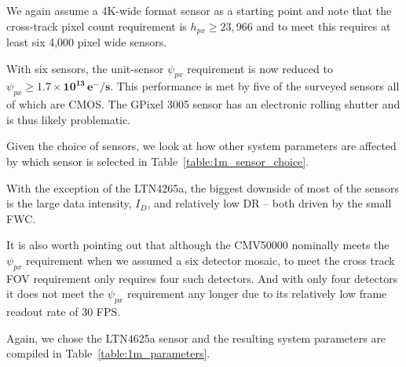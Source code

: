 \documentclass[10pt,journal]{IEEEtran}  %
\begin{document}
We again assume a 4K-wide format sensor as a starting point and note that the cross-track pixel count requirement is $h_{px} \geq 23,966$ and to meet this requires at least six 4,000 pixel wide sensors.

With six sensors, the unit-sensor $\psi_{px}$ requirement is now reduced to $\psi_{px} \geq \mathbf{1.7 \times 10^{13} \, e^-/s}$. This performance is met by five of the surveyed sensors all of which are CMOS.  The GPixel 3005 sensor has an electronic rolling shutter and is thus likely problematic.

Given the choice of sensors, we look at how other system parameters are affected by which sensor is selected in Table~\ref{table:1m_sensor_choice}.

\begin{table}[h!]
\centering
{}
\caption{Impact of sensor choice on other system parameters}
\label{table:1m_sensor_choice}
\end{table}

With the exception of the LTN4265a, the biggest downside of most of the sensors is the large data intensity, $I_D$, and relatively low DR -- both driven by the small FWC.

It is also worth pointing out that although the CMV50000 nominally meets the $\psi_{px}$ requirement when we assumed a six detector mosaic, to meet the cross track FOV requirement only requires four such detectors.  And with only four detectors it does not meet the $\psi_{px}$ requirement any longer due to its relatively low frame readout rate of 30 FPS.

Again, we chose the LTN4625a sensor and the resulting system parameters are compiled in Table~\ref{table:1m_parameters}.
\end{document}
